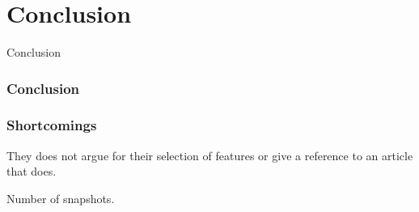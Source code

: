 \section{Conclusion}

\begin{frame}
\begin{center}
     	\huge Conclusion
     \end{center}
\end{frame}

\begin{frame}
\frametitle{Conclusion}
\end{frame}

\begin{frame}
\frametitle{Shortcomings}
They does not argue for their selection of features or give a reference to an article that does.

Number of snapshots.
\end{frame}
